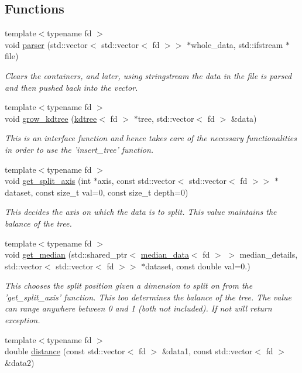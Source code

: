 \subsection*{Functions}
\begin{DoxyCompactItemize}
\item 
{\footnotesize template$<$typename fd $>$ }\\void \hyperlink{namespacekdspace_ae38cb61fa0fc73b8cced4a1bc0fb1d58}{parser} (std\-::vector$<$ std\-::vector$<$ fd $>$$>$ $\ast$whole\-\_\-data, std\-::ifstream $\ast$file)
\begin{DoxyCompactList}\small\item\em Clears the containers, and later, using stringstream the data in the file is parsed and then pushed back into the vector. \end{DoxyCompactList}\item 
{\footnotesize template$<$typename fd $>$ }\\void \hyperlink{namespacekdspace_aed82e0d7ec733c0e3a0e354dd0026e4b}{grow\-\_\-kdtree} (\hyperlink{classkdtree}{kdtree}$<$ fd $>$ $\ast$tree, std\-::vector$<$ fd $>$ \&data)
\begin{DoxyCompactList}\small\item\em This is an interface function and hence takes care of the necessary functionalities in order to use the 'insert\-\_\-tree' function. \end{DoxyCompactList}\item 
{\footnotesize template$<$typename fd $>$ }\\void \hyperlink{namespacekdspace_a83f456b7acaa6bb56f45158655aa1f83}{get\-\_\-split\-\_\-axis} (int $\ast$axis, const std\-::vector$<$ std\-::vector$<$ fd $>$$>$ $\ast$dataset, const size\-\_\-t val=0, const size\-\_\-t depth=0)
\begin{DoxyCompactList}\small\item\em This decides the axis on which the data is to split. This value maintains the balance of the tree. \end{DoxyCompactList}\item 
{\footnotesize template$<$typename fd $>$ }\\void \hyperlink{namespacekdspace_a4f7e287c43237fb7400437c8ecf955f3}{get\-\_\-median} (std\-::shared\-\_\-ptr$<$ \hyperlink{classkdspace_1_1median__data}{median\-\_\-data}$<$ fd $>$ $>$ median\-\_\-details, std\-::vector$<$ std\-::vector$<$ fd $>$$>$ $\ast$dataset, const double val=0.)
\begin{DoxyCompactList}\small\item\em This chooses the split position given a dimension to split on from the 'get\-\_\-split\-\_\-axis' function. This too determines the balance of the tree. The value can range anywhere between 0 and 1 (both not included). If not will return exception. \end{DoxyCompactList}\item 
{\footnotesize template$<$typename fd $>$ }\\double \hyperlink{namespacekdspace_a7273e612072ca0ae8689762a3c224da9}{distance} (const std\-::vector$<$ fd $>$ \&data1, const std\-::vector$<$ fd $>$ \&data2)
\end{DoxyCompactItemize}
